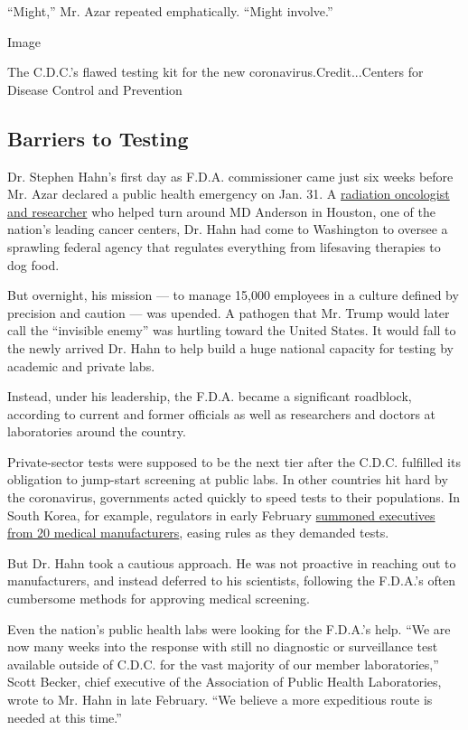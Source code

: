``Might,'' Mr. Azar repeated emphatically. ``Might involve.''

Image

The C.D.C.'s flawed testing kit for the new coronavirus.Credit...Centers
for Disease Control and Prevention

\hypertarget{barriers-to-testing}{%
\subsection{Barriers to Testing}\label{barriers-to-testing}}

Dr. Stephen Hahn's first day as F.D.A. commissioner came just six weeks
before Mr. Azar declared a public health emergency on Jan. 31. A
\href{https://www.nytimes3xbfgragh.onion/2019/11/01/health/fda-commissioner-hahn.html}{radiation
oncologist and researcher} who helped turn around MD Anderson in
Houston, one of the nation's leading cancer centers, Dr. Hahn had come
to Washington to oversee a sprawling federal agency that regulates
everything from lifesaving therapies to dog food.

But overnight, his mission --- to manage 15,000 employees in a culture
defined by precision and caution --- was upended. A pathogen that Mr.
Trump would later call the ``invisible enemy'' was hurtling toward the
United States. It would fall to the newly arrived Dr. Hahn to help build
a huge national capacity for testing by academic and private labs.

Instead, under his leadership, the F.D.A. became a significant
roadblock, according to current and former officials as well as
researchers and doctors at laboratories around the country.

Private-sector tests were supposed to be the next tier after the C.D.C.
fulfilled its obligation to jump-start screening at public labs. In
other countries hit hard by the coronavirus, governments acted quickly
to speed tests to their populations. In South Korea, for example,
regulators in early February
\href{https://www.nytimes3xbfgragh.onion/reuters/2020/03/18/world/asia/18reuters-health-coronavirus-testing-specialreport.html}{summoned
executives from 20 medical manufacturers}, easing rules as they demanded
tests.

But Dr. Hahn took a cautious approach. He was not proactive in reaching
out to manufacturers, and instead deferred to his scientists, following
the F.D.A.'s often cumbersome methods for approving medical screening.

Even the nation's public health labs were looking for the F.D.A.'s help.
``We are now many weeks into the response with still no diagnostic or
surveillance test available outside of C.D.C. for the vast majority of
our member laboratories,'' Scott Becker, chief executive of the
Association of Public Health Laboratories, wrote to Mr. Hahn in late
February. ``We believe a more expeditious route is needed at this
time.''

